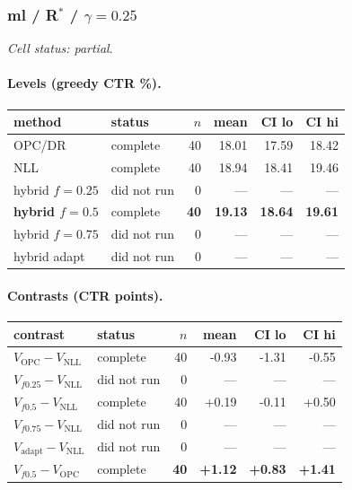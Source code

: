 \documentclass[10pt,a4paper]{article}
\begin{document}
\subsubsection{ml / R$^*$ / $\gamma=0.25$}
\emph{Cell status: partial}.
\paragraph{Levels (greedy CTR \%).}
{\centering\small\begin{tabular}{llrrrr}
\toprule method & status & $n$ & mean & CI lo & CI hi \\
\midrule
OPC/DR & complete & 40 & 18.01 & 17.59 & 18.42 \\
NLL & complete & 40 & 18.94 & 18.41 & 19.46 \\
hybrid $f{=}0.25$ & did not run & 0 & --- & --- & --- \\
\textbf{hybrid $f{=}0.5$} & complete & \textbf{40} & \textbf{19.13} & \textbf{18.64} & \textbf{19.61} \\
hybrid $f{=}0.75$ & did not run & 0 & --- & --- & --- \\
hybrid adapt & did not run & 0 & --- & --- & --- \\
\bottomrule\end{tabular}\par}
\paragraph{Contrasts (CTR points).}
{\centering\small\begin{tabular}{llrrrr}
\toprule contrast & status & $n$ & mean & CI lo & CI hi \\
\midrule
$V_{\mathrm{OPC}}-V_{\mathrm{NLL}}$ & complete & 40 & -0.93 & -1.31 & -0.55 \\
$V_{f0.25}-V_{\mathrm{NLL}}$ & did not run & 0 & --- & --- & --- \\
$V_{f0.5}-V_{\mathrm{NLL}}$ & complete & 40 & +0.19 & -0.11 & +0.50 \\
$V_{f0.75}-V_{\mathrm{NLL}}$ & did not run & 0 & --- & --- & --- \\
$V_{\mathrm{adapt}}-V_{\mathrm{NLL}}$ & did not run & 0 & --- & --- & --- \\
\textbf{$V_{f0.5}-V_{\mathrm{OPC}}$} & complete & \textbf{40} & \textbf{+1.12} & \textbf{+0.83} & \textbf{+1.41} \\
\bottomrule\end{tabular}\par}
\end{document}
